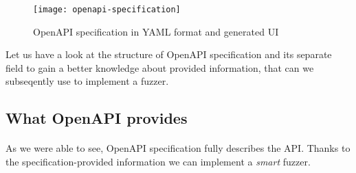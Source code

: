 \begin{figure}[h]
  \texttt{[image: openapi-specification]}
  \caption{OpenAPI specification in YAML format and generated UI}
  \label{fig:openapi-specification}
\end{figure}

Let us have a look at the structure of OpenAPI specification and its separate field to gain a better knowledge about provided information, that can we subseqently use to implement a fuzzer.



\subsection{What OpenAPI provides}

\paragraph{}
As we were able to see, OpenAPI specification fully describes the API. Thanks to the specification-provided information we can implement a \emph{smart} fuzzer.
